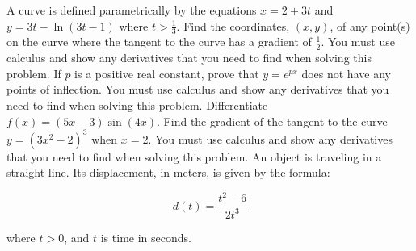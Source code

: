 \documentclass[12pt,addpoints]{exam}
\begin{document}
\begin{questions}
\fillwithlines{3cm}
\question[5] A curve is defined parametrically by the equations \( x = 2 + 3t \) and \( y = 3t - \ln(3t - 1) \) where \( t > \frac{1}{3} \). Find the coordinates, \((x, y)\), of any point(s) on the curve where the tangent to the curve has a gradient of \(\frac{1}{2}\). You must use calculus and show any derivatives that you need to find when solving this problem.
\fillwithlines{3cm}
\question[5] If \( p \) is a positive real constant, prove that \( y = e^{px} \) does not have any points of inflection. You must use calculus and show any derivatives that you need to find when solving this problem.
\fillwithlines{3cm}
\question[5] Differentiate \( f(x) = (5x - 3) \sin(4x) \).
\fillwithlines{3cm}
\question[5] Find the gradient of the tangent to the curve \( y = \left(3x^2 - 2\right)^3 \) when \( x = 2 \). You must use calculus and show any derivatives that you need to find when solving this problem.
\fillwithlines{3cm}
\question[5] An object is traveling in a straight line. Its displacement, in meters, is given by the formula:

\[ d(t) = \frac{t^2 - 6}{2t^3} \]

where \( t > 0 \), and \( t \) is time in seconds.


\end{questions}
\end{document}

